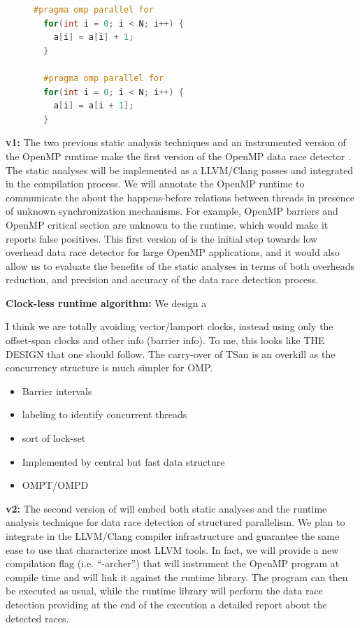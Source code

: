 \begin{figure}
  \vspace{-2ex}
  \begin{lstlisting}[language=C++, caption=OpenMP loops with and without loop-carried data dependency., label=code:example01]
  #pragma omp parallel for
  for(int i = 0; i < N; i++) {
    a[i] = a[i] + 1;
  }

  #pragma omp parallel for
  for(int i = 0; i < N; i++) {
    a[i] = a[i + 1];
  }
  \end{lstlisting}
\end{figure}

\textbf{\archer v1:} The two previous static analysis techniques and an
instrumented version of the OpenMP runtime make the first version of the
OpenMP data race detector \archer.
%
The static analyses will be implemented as a LLVM/Clang passes and integrated
in the compilation process.
%
We will annotate the OpenMP runtime to communicate the \tsan about the
happens-before relations between threads in presence of unknown
synchronization mechanisms.
%
For example, OpenMP barriers and OpenMP critical section are unknown to the
\tsan runtime, which would make it reports false positives.
%
This first version of \archer is the initial step towards low overhead data
race detector for large OpenMP applications, and it would also allow us to
evaluate the benefits of the static analyses in terms of both overheads
reduction, and precision and accuracy of the data race detection process.

\textbf{Clock-less runtime algorithm:} We design a 

I think we are totally avoiding vector/lamport clocks, instead using only the offset-span clocks and other info (barrier info). 
To me, this looks like THE DESIGN that one should follow.  The carry-over of
TSan is an overkill as the concurrency structure is much simpler for OMP.

\begin{itemize}
\item Barrier intervals
\item labeling to identify concurrent threads
\item sort of lock-set
\item Implemented by central but fast data structure
\item OMPT/OMPD
\end{itemize}

\textbf{\archer v2:} The second version of \archer will embed both static
analyses and the runtime analysis technique for data race detection of
structured parallelism.
%
We plan to integrate \archer in the LLVM/Clang compiler infrastructure and
guarantee the same ease to use that characterize most LLVM tools.
%
In fact, we will provide a new compilation flag (i.e. ``-archer'') that will
instrument the OpenMP program at compile time and will link it against the
\archer runtime library.
%
The program can then be executed as usual, while the \archer runtime library
will perform the data race detection providing at the end of the execution a
detailed report about the detected races.

